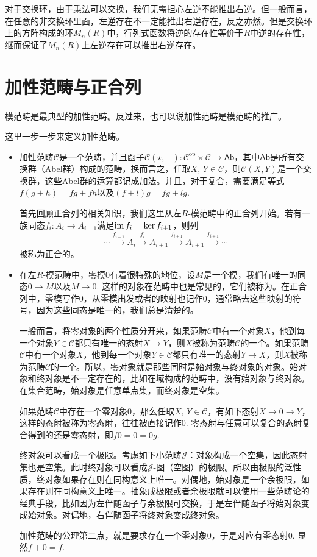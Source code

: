对于交换环，由于乘法可以交换，我们无需担心左逆不能推出右逆。但一般而言，在任意的非交换环里面，左逆存在不一定能推出右逆存在，反之亦然。但是交换环上的方阵构成的环$M_n(R)$中，行列式函数将逆的存在性等价于$R$中逆的存在性，继而保证了$M_n(R)$上左逆存在可以推出右逆存在。

\section{加性范畴与正合列}

模范畴是最典型的加性范畴。反过来，也可以说加性范畴是模范畴的推广。

这里一步一步来定义加性范畴。
\begin{itemize}

\item 加性范畴$\mathcal{C}$是一个范畴，并且函子$\mathcal{C}(\star,-):\mathcal{C}^{\text{op}}\times \mathcal{C}\to \mathsf{Ab}$，其中$\mathsf{Ab}$是所有交换群（Abel群）构成的范畴，换而言之，任取$X$, $Y\in \mathcal{C}$，则$\mathcal{C}(X,Y)$是一个交换群，这些Abel群的运算都记成加法。并且，对于复合，需要满足等式$f(g+h)=fg+fh$以及$(f+l)g=fg+lg$.

首先回顾正合列的相关知识，我们这里从左$R$-模范畴中的正合列开始。若有一族同态$f_i:A_i\to A_{i+1}$满足$\operatorname{im} f_i=\ker f_{i+1}$，则列
\[
	\cdots \xrightarrow{f_{i-1}}A_i \xrightarrow{f_i} A_{i+1} \xrightarrow{f_{i+1}} A_{i+1}\xrightarrow{f_{i+1}}\cdots
\]
被称为正合的。

\item 在左$R$-模范畴中，零模$0$有着很特殊的地位，设$M$是一个模，我们有唯一的同态$0\to M$以及$M\to 0$. 这样的对象在范畴中也是常见的，它们被称为。在正合列中，零模写作$0$，从零模出发或者的映射也记作$0$，通常略去这些映射的符号，因为这些同态是唯一的，我们总是清楚的。

一般而言，将零对象的两个性质分开来，如果范畴$\mathcal{C}$中有一个对象$X$，他到每一个对象$Y\in \mathcal{C}$都只有唯一的态射$X\to Y$，则$X$被称为范畴$\mathcal{C}$的一个。如果范畴$\mathcal{C}$中有一个对象$X$，他到每一个对象$Y\in \mathcal{C}$都只有唯一的态射$Y\to X$，则$X$被称为范畴$\mathcal{C}$的一个。所以，零对象就是那些同时是始对象与终对象的对象。始对象和终对象是不一定存在的，比如在域构成的范畴中，没有始对象与终对象。在集合范畴，始对象是任意单点集，而终对象是空集。

如果范畴$\mathcal{C}$中存在一个零对象$0$，那么任取$X$, $Y\in\mathcal{C}$，有如下态射$X\to 0\to Y$，这样的态射被称为零态射，往往被直接记作$0$. 零态射与任意可以复合的态射复合得到的还是零态射，即$f0=0=0g$.

终对象可以看成一个极限。考虑如下小范畴$\mathcal{J}$：对象构成一个空集，因此态射集也是空集。此时终对象可以看成$\mathcal{J}$-图（空图）的极限。所以由极限的泛性质，终对象如果存在则在同构意义上唯一。对偶地，始对象是一个余极限，如果存在则在同构意义上唯一。抽象成极限或者余极限就可以使用一些范畴论的经典手段，比如因为左伴随函子与余极限可交换，于是左伴随函子将始对象变成始对象。对偶地，右伴随函子将终对象变成终对象。

加性范畴的公理第二点，就是要求存在一个零对象$0$，于是对应有零态射$0$. 显然$f+0=f$.

\end{itemize}

